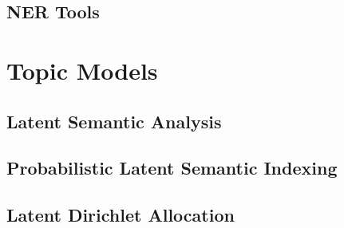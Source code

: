\documentclass[12pt, letterpaper, twoside]{report}
\begin{document}
\subsection{NER Tools}

\section{Topic Models}

\subsection{Latent Semantic Analysis}

\subsection{Probabilistic Latent Semantic Indexing}

\subsection{Latent Dirichlet Allocation}



\
\end{document}
